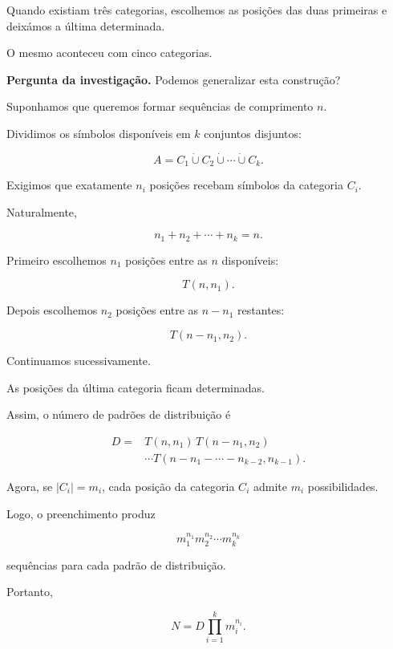 \documentclass[11pt,a4paper,oneside]{book}
\newcommand{\Pergunta}[1]{\begin{perguntabox}\textbf{Pergunta da investigação.} #1\end{perguntabox}}
\newcommand{\card}[1]{\lvert #1\rvert}
\begin{document}
Quando existiam três categorias,
escolhemos as posições das duas
primeiras e deixámos a última
determinada.

O mesmo aconteceu com
cinco categorias.

\Pergunta{Podemos generalizar
esta construção?}

Suponhamos que queremos
formar sequências de comprimento $n$.

Dividimos os símbolos disponíveis
em $k$ conjuntos disjuntos:

\[
A=C_1\mathbin{\dot\cup}
C_2\mathbin{\dot\cup}\cdots
\mathbin{\dot\cup}C_k.
\]

Exigimos que exatamente $n_i$
posições recebam símbolos
da categoria $C_i$.

Naturalmente,

\[
n_1+n_2+\cdots+n_k=n.
\]

Primeiro escolhemos $n_1$
posições entre as $n$ disponíveis:

\[
T(n,n_1).
\]

Depois escolhemos $n_2$
posições entre as $n-n_1$ restantes:

\[
T(n-n_1,n_2).
\]

Continuamos sucessivamente.

As posições da última categoria
ficam determinadas.

Assim, o número de padrões
de distribuição é

\[
\begin{aligned}
D={}&T(n,n_1)\,
T(n-n_1,n_2)\\
&\cdots
T(n-n_1-\cdots-n_{k-2},n_{k-1}).
\end{aligned}
\]

Agora, se $\card{C_i}=m_i$,
cada posição da categoria $C_i$
admite $m_i$ possibilidades.

Logo, o preenchimento produz

\[
m_1^{n_1}m_2^{n_2}\cdots m_k^{n_k}
\]

sequências para cada padrão
de distribuição.

Portanto,

\[
\boxed{
N=D\prod_{i=1}^{k}m_i^{n_i}
}.
\]
\end{document}
